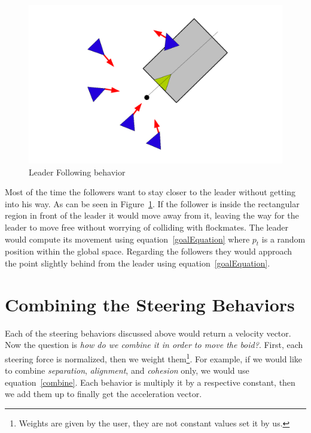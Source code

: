 \begin{figure}[htbp]
\begin{center}
\includegraphics[scale=0.5]{figures/leaderFollowing.pdf}
\caption{Leader Following behavior}
\label{leaderPDF}
\end{center}
\end{figure}

Most of the time the followers want to stay closer to the leader without getting into his way. As can be seen in Figure~\ref{leaderPDF}.  If the follower is inside the rectangular region in front of the leader it would move away from it, leaving the way for the leader to move free without worrying of colliding with flockmates. The leader would compute its movement using equation~\ref{goalEquation} where $p_t$ is a random position within the global space. Regarding the followers they would approach the point slightly behind from the leader using equation~\ref{goalEquation}.

\section{Combining the Steering Behaviors}
Each of the steering behaviors discussed above would return a velocity vector. Now the question is \textit{how do we combine it in order to move the boid?}. First, each steering force is normalized, then we weight them\footnote{Weights are given by the user, they are not constant values set it by us.}. For example, if we would like to combine \textit{separation}, \textit{alignment}, and \textit{cohesion} only, we would use equation~\ref{combine}. Each behavior is multiply it by a respective constant, then we add them up to finally get the acceleration vector.

